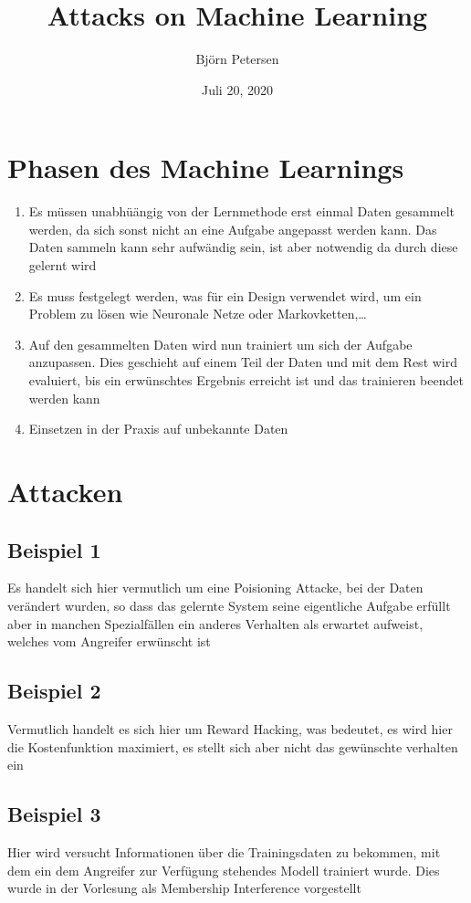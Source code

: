 \documentclass[a4paper,12pt,
headsepline,           %
oneside,               %
pointlessnumbers,      %
bibtotoc,              %
BCOR15mm               %
]{scrbook}
\title{Attacks on Machine Learning}
\date{Juli 20, 2020}
\author{Björn Petersen}
\begin{document}
\maketitle

\section*{Phasen des Machine Learnings}
\begin{enumerate}
    \item Es müssen unabhüängig von der Lernmethode erst einmal Daten gesammelt werden, da sich sonst nicht an eine Aufgabe angepasst werden kann. Das Daten sammeln kann sehr aufwändig sein, ist aber notwendig da durch diese gelernt wird
    \item Es muss festgelegt werden, was für ein Design verwendet wird, um ein Problem zu lösen wie Neuronale Netze oder Markovketten,\dots
    \item Auf den gesammelten Daten wird nun trainiert um sich der Aufgabe anzupassen. Dies geschieht auf einem Teil der Daten und mit dem Rest wird evaluiert, bis ein erwünschtes Ergebnis erreicht ist und das trainieren beendet werden kann
    \item Einsetzen in der Praxis auf unbekannte Daten
\end{enumerate}

\section*{Attacken}
\subsection*{Beispiel 1}
Es handelt sich hier vermutlich um eine Poisioning Attacke, bei der Daten verändert wurden, so dass das gelernte System seine eigentliche Aufgabe erfüllt aber in manchen Spezialfällen ein anderes Verhalten als erwartet aufweist, welches vom Angreifer erwünscht ist
\subsection*{Beispiel 2}
Vermutlich handelt es sich hier um Reward Hacking, was bedeutet, es wird hier die Kostenfunktion maximiert, es stellt sich aber nicht das gewünschte verhalten ein
\subsection*{Beispiel 3}
Hier wird versucht Informationen über die Trainingsdaten zu bekommen, mit dem ein dem Angreifer zur Verfügung stehendes Modell trainiert wurde. Dies wurde in der Vorlesung als Membership Interference vorgestellt
\end{document}

